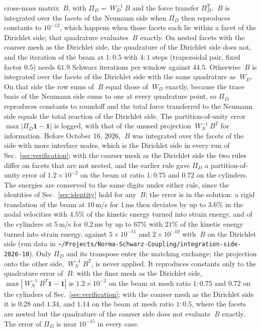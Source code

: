 \documentclass[11pt]{article}
\newcommand{\code}[1]{\texttt{#1}}
\begin{document}
cross-mass matrix $~B$, with $\Pi_D = ~W_D^{-1} ~B$ and the force transfer
$\Pi_D^T$. $~B$ is integrated over the facets of the Neumann side when
$\Pi_D$ then reproduces constants to $10^{-12}$, which happens when those
facets each lie within a facet of the Dirichlet side; that quadrature
evaluates $~B$ exactly. On nested facets with the coarser mesh as the
Dirichlet side, the quadrature of the Dirichlet side does not, and the
iteration of the beam at $1{:}0.5$ with $4{:}1$ steps (trapezoidal pair, fixed
factor $0.5$) needs $61.9$ Schwarz iterations per window against $44.5$.
Otherwise $~B$ is integrated over the facets of the Dirichlet side with the
same quadrature as $~W_D$. On that side the row sums of $~B$ equal
those of $~W_D$ exactly, because the trace basis of the Neumann side sums to
one at every quadrature point, so $\Pi_D$ reproduces constants to roundoff
and the total force transferred to the Neumann side equals the total
reaction of the Dirichlet side. The partition-of-unity error
$\max|\Pi_D \mathbf{1} - \mathbf{1}|$ is logged, with that of the unused
projection $~W_N^{-1} ~B^T$ for information. Before October 16, 2026, $~B$
was integrated over the facets of the side with more interface nodes, which
is the Dirichlet side in every run of Sec.~\ref{sec:verification}; with the
coarser mesh as the Dirichlet side the two rules differ on facets that are
not nested, and the earlier rule gave $\Pi_D$ a partition-of-unity error
of $1.2\times 10^{-2}$ on the beam at ratio $1{:}0.75$ and $0.72$ on the
cylinders. The energies are conserved to the same digits under either
rule, since the identities of Sec.~\ref{sec:identity} hold for any $~B$;
the error is in the solution: a rigid translation of the beam at $10$\,m/s
for $1$\,ms then deviates by up to $3.6\%$ in the nodal velocities with
$4.5\%$ of the kinetic energy turned into strain energy, and of the
cylinders at $5$\,m/s for $0.2$\,ms by up to $67\%$ with $21\%$ of the
kinetic energy turned into strain energy, against $5\times 10^{-11}$ and
$2\times 10^{-10}$ with $~B$ on the Dirichlet side (run data in
\code{\textasciitilde/Projects/Norma-Schwarz-Coupling/integration-side-2026-10}). Only $\Pi_D$ and its transpose enter the matching exchange; the
projection onto the other side, $~W_N^{-1} ~B^T$, is never applied. It
reproduces constants only to the quadrature error of $~B$: with the finer
mesh as the Dirichlet side, $\max|~W_N^{-1} ~B^T \mathbf{1} - \mathbf{1}|$
is $1.2 \times 10^{-2}$ on the beam at mesh ratio $1{:}0.75$ and $0.72$ on
the cylinders of Sec.~\ref{sec:verification}; with the coarser mesh as the
Dirichlet side it is $0.28$ and $1.34$, and $1.14$ on the beam at mesh
ratio $1{:}0.5$, where the facets are nested but the quadrature of the
coarser side does not evaluate $~B$ exactly. The error of $\Pi_D$ is near
$10^{-15}$ in every case.
\end{document}
